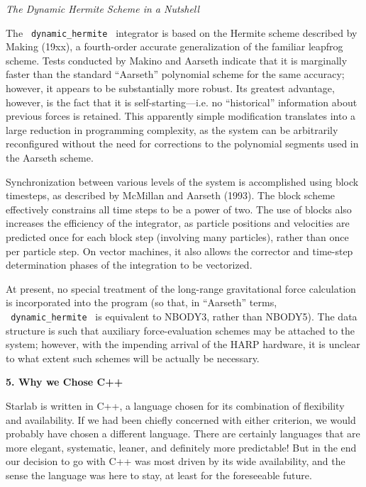 \bigskip
\noindent
{\it The Dynamic Hermite Scheme in a Nutshell}
\medskip

The {\tt\ dynamic\_hermite\ } integrator is based on the Hermite
scheme described by Making (19xx), a fourth-order accurate
generalization of the familiar leapfrog scheme.  Tests conducted by
Makino and Aarseth indicate that it is marginally faster than the
standard ``Aarseth'' polynomial scheme for the same accuracy; however,
it appears to be substantially more robust.  Its greatest advantage,
however, is the fact that it is self-starting---i.e. no ``historical''
information about previous forces is retained.  This apparently simple
modification translates into a large reduction in programming
complexity, as the system can be arbitrarily reconfigured without the
need for corrections to the polynomial segments used in the Aarseth
scheme.

Synchronization between various levels of the system is accomplished
using block timesteps, as described by McMillan and Aarseth (1993).
The block scheme effectively constrains all time steps to be a power
of two.  The use of blocks also increases the efficiency of the
integrator, as particle positions and velocities are predicted once
for each block step (involving many particles), rather than once per
particle step.  On vector machines, it also allows the corrector and
time-step determination phases of the integration to be vectorized.

At present, no special treatment of the long-range gravitational force
calculation is incorporated into the program (so that, in ``Aarseth''
terms, {\tt\ dynamic\_hermite\ } is equivalent to NBODY3, rather than
NBODY5).  The data structure is such that auxiliary force-evaluation
schemes may be attached to the system; however, with the impending
arrival of the HARP hardware, it is unclear to what extent such
schemes will be actually be necessary.

\null\bigskip
\centerline{\bf 5. Why we Chose C++}
\medskip

Starlab is written in C++, a language chosen for its combination of
flexibility and availability.  If we had been chiefly concerned with
either criterion, we would probably have chosen a different language.
There are certainly languages that are more elegant, systematic,
leaner, and definitely more predictable!  But in the end our decision
to go with C++ was most driven by its wide availability, and the sense
the language was here to stay, at least for the foreseeable future.

